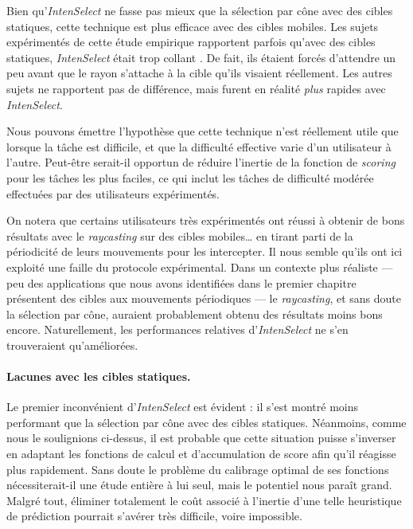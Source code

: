 	Bien qu'\emph{IntenSelect} ne fasse pas mieux que la sélection par cône avec des cibles statiques, cette technique est plus efficace avec des cibles mobiles. Les sujets expérimentés de cette étude empirique rapportent parfois qu'avec des cibles statiques, \emph{IntenSelect} était trop \og collant \fg{}. De fait, ils étaient forcés d'attendre un peu avant que le rayon s'attache à la cible qu'ils visaient réellement. Les autres sujets ne rapportent pas de différence, mais furent en réalité \emph{plus} rapides avec \emph{IntenSelect}.
	
	Nous pouvons émettre l'hypothèse que cette technique n'est réellement utile que lorsque la tâche est difficile, et que la difficulté effective varie d'un utilisateur à l'autre. Peut-être serait-il opportun de réduire l'inertie de la fonction de \emph{scoring} pour les tâches les plus faciles, ce qui inclut les tâches de difficulté modérée effectuées par des utilisateurs expérimentés.
	
	On notera que certains utilisateurs très expérimentés ont réussi à obtenir de bons résultats avec le \emph{raycasting} sur des cibles mobiles\ldots{} en tirant parti de la périodicité de leurs mouvements pour les intercepter. Il nous semble qu'ils ont ici exploité une faille du protocole expérimental. Dans un contexte plus réaliste --- peu des applications que nous avons identifiées dans le premier chapitre présentent des cibles aux mouvements périodiques --- le \emph{raycasting}, et sans doute la sélection par cône, auraient probablement obtenu des résultats moins bons encore. Naturellement, les performances relatives d'\emph{IntenSelect} ne s'en trouveraient qu'améliorées.
	
	\paragraph{Lacunes avec les cibles statiques.}
	Le premier inconvénient d'\emph{IntenSelect} est évident : il s'est montré moins performant que la sélection par cône avec des cibles statiques. Néanmoins, comme nous le soulignions ci-dessus, il est probable que cette situation puisse s'inverser en adaptant les fonctions de calcul et d'accumulation de score afin qu'il réagisse plus rapidement. Sans doute le problème du calibrage optimal de ses fonctions nécessiterait-il une étude entière à lui seul, mais le potentiel nous paraît grand. Malgré tout, éliminer totalement le coût associé à l'inertie d'une telle heuristique de prédiction pourrait s'avérer très difficile, voire impossible.
	
